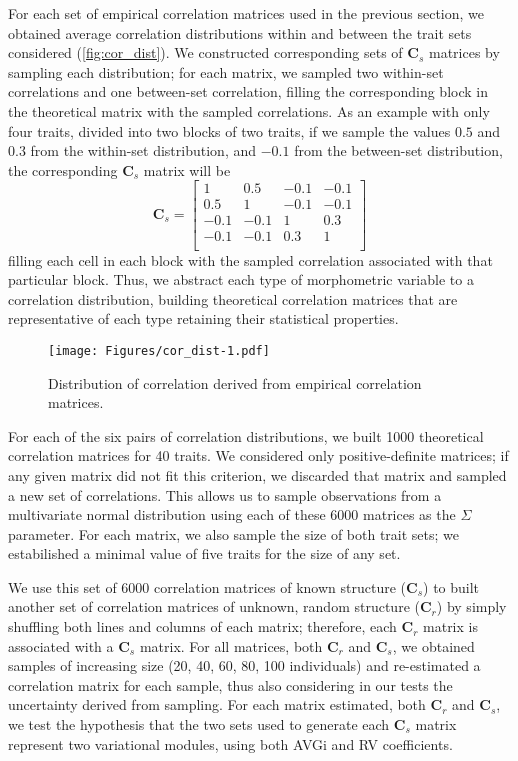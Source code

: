 \documentclass[12pt,]{article}
\begin{document}
For each set of empirical correlation matrices used in the previous
section, we obtained average correlation distributions within and
between the trait sets considered (\autoref{fig:cor_dist}). We
constructed corresponding sets of $\mathbf{C}_{s}$ matrices by sampling
each distribution; for each matrix, we sampled two within-set
correlations and one between-set correlation, filling the corresponding
block in the theoretical matrix with the sampled correlations. As an
example with only four traits, divided into two blocks of two traits, if
we sample the values $0.5$ and $0.3$ from the within-set distribution,
and $-0.1$ from the between-set distribution, the corresponding
$\mathbf{C}_{s}$ matrix will be \[
\mathbf{C}_s =
\begin{bmatrix}
1 & 0.5 & -0.1 & -0.1 \\
0.5 & 1 & -0.1 & -0.1 \\
-0.1 & -0.1 & 1 & 0.3 \\
-0.1 & -0.1 & 0.3 & 1 \\
\end{bmatrix}
\] filling each cell in each block with the sampled correlation
associated with that particular block. Thus, we abstract each type of
morphometric variable to a correlation distribution, building
theoretical correlation matrices that are representative of each type
retaining their statistical properties.

\begin{figure}[htbp]
\centering
\texttt{[image: Figures/cor\_dist-1.pdf]}
\caption{Distribution of correlation derived from empirical correlation
matrices. \label{fig:cor_dist}}
\end{figure}

For each of the six pairs of correlation distributions, we built 1000
theoretical correlation matrices for 40 traits. We considered only
positive-definite matrices; if any given matrix did not fit this
criterion, we discarded that matrix and sampled a new set of
correlations. This allows us to sample observations from a multivariate
normal distribution using each of these 6000 matrices as the $\Sigma$
parameter. For each matrix, we also sample the size of both trait sets;
we estabilished a minimal value of five traits for the size of any set.

We use this set of 6000 correlation matrices of known structure
($\mathbf{C}_s$) to built another set of correlation matrices of
unknown, random structure ($\mathbf{C}_r$) by simply shuffling both
lines and columns of each matrix; therefore, each $\mathbf{C}_r$ matrix
is associated with a $\mathbf{C}_s$ matrix. For all matrices, both
$\mathbf{C}_r$ and $\mathbf{C}_s$, we obtained samples of increasing
size (20, 40, 60, 80, 100 individuals) and re-estimated a correlation
matrix for each sample, thus also considering in our tests the
uncertainty derived from sampling. For each matrix estimated, both
$\mathbf{C}_r$ and $\mathbf{C}_s$, we test the hypothesis that the two
sets used to generate each $\mathbf{C}_s$ matrix represent two
variational modules, using both AVGi and RV coefficients.
\end{document}
